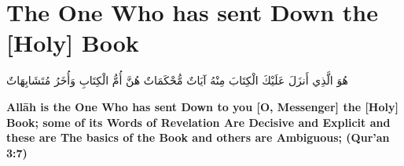 \chapter{The One Who has sent Down the [Holy] Book}
\begin{center}
    {\Huge    
        \begin{Arabic}
            هُوَ الَّذِي أَنزَلَ عَلَيْكَ الْكِتَابَ مِنْهُ آيَاتٌ مُّحْكَمَاتٌ هُنَّ أُمُّ الْكِتَابِ وَأُخَرُ مُتَشَابِهَاتٌ
        \end{Arabic}
    }    
\end{center}
\vspace*{\fill}
\vspace{3cm}
\begin{center}
    \large \textbf{Allāh is the One Who has sent Down to you [O, Messenger] the [Holy] Book; some of its Words of Revelation Are Decisive and Explicit and these are The basics of the Book and others are Ambiguous; (Qur'an 3:7)}
\end{center}
